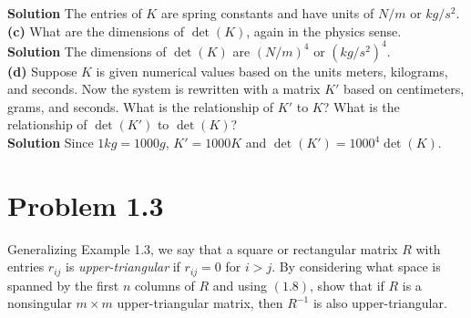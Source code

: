 \documentclass{article}
\newcommand{\enterProblemHeader}[1]{
    \nobreak\extramarks{}{Problem \arabic{#1} continued on next page\ldots}\nobreak{}
    \nobreak\extramarks{Problem \arabic{#1} (continued)}{Problem \arabic{#1} continued on next page\ldots}\nobreak{}
}
\newcommand{\exitProblemHeader}[1]{
    \nobreak\extramarks{Problem \arabic{#1} (continued)}{Problem \arabic{#1} continued on next page\ldots}\nobreak{}
    \stepcounter{#1}
    \nobreak\extramarks{Problem \arabic{#1}}{}\nobreak{}
}
\newcounter{partCounter}
\newcounter{homeworkProblemCounter}
\newenvironment{homeworkProblem}[1][-1]{
    \ifnum#1>0
        \setcounter{homeworkProblemCounter}{#1}
    \fi
    \section{Problem \arabic{homeworkProblemCounter}}
    \setcounter{partCounter}{1}
    \enterProblemHeader{homeworkProblemCounter}
}{
    \exitProblemHeader{homeworkProblemCounter}
}
\begin{document}
    \textbf{Solution}
    The entries of $K$ are spring constants and have units of $N/m$ or $kg/s^2$.\\

    \textbf{(c)} What are the dimensions of $\det (K)$, again in the physics sense.\\
    
    \textbf{Solution}
    The dimensions of $\det (K)$ are $(N/m)^4$ or $(kg/s^2)^4$.\\

    \textbf{(d)} Suppose $K$ is given numerical values based on the units meters, kilograms, and seconds. Now the system is rewritten with a matrix $K'$ based on centimeters, grams, and seconds. What is the relationship of $K'$ to $K$? What is the relationship of $\det (K')$ to $\det(K)$?\\
    
    \textbf{Solution}
    Since $1kg = 1000g$, $K' = 1000 K$ and $\det(K') = 1000^4 \det(K)$.\\


\pagebreak
\section*{Problem 1.3}
    Generalizing Example 1.3, we say that a square or rectangular matrix $R$ with entries $r_{ij}$ is \textit{upper-triangular} if $r_{ij} = 0$ for $i > j$. By considering what space is spanned by the first $n$ columns of $R$ and using $(1.8)$, show that if $R$ is a nonsingular $m \times m$ upper-triangular matrix, then $R^{-1}$ is also upper-triangular. \\
\end{document}
